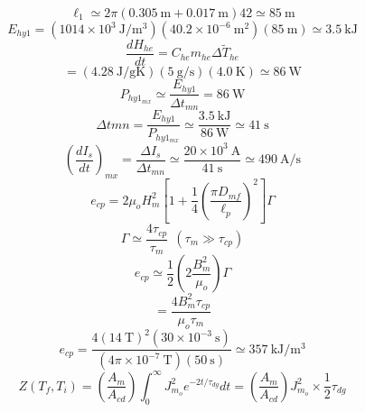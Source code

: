 \begin{equation}%
\ell_1\simeq2\pi(0.305\ \mathrm{m}+0.017\ \mathrm{m})42\simeq85\ \mathrm{m}
\end{equation}
\begin{equation}%
E_{hy1}=(1014\times10^3\ \mathrm{J/m^3})(40.2\times10^{-6}\ \mathrm{m^2})(85\ \mathrm{m})\simeq 3.5\ \mathrm{kJ}
\end{equation}
\begin{equation}%
\frac{dH_{he}}{dt}=C_{he}m_{he}\Delta\tilde{T}_{he}
\end{equation}
\begin{equation}%
=(4.28\ \mathrm{J/gK})(5\ \mathrm{g/s})(4.0\ \mathrm{K})\simeq86\ \mathrm{W}
\end{equation}
\begin{equation}%
P_{hy1_{mx}}\simeq\frac{E_{hy1}}{\Delta t_{mn}}=86\ \mathrm{W}
\end{equation}
\begin{equation}%
\Delta t{mn}=\frac{E_{hy1}}{P_{hy1_{mx}}}\simeq\frac{3.5\ \mathrm{kJ}}{86\ \mathrm{W}}\simeq41\ \mathrm{s}
\end{equation}
\begin{equation}%
(\frac{dI_s}{dt})_{mx}=\frac{\Delta I_s}{\Delta t_{mn}}\simeq\frac{20\times10^3\ \mathrm{A}}{41\ \mathrm{s}}\simeq490\ \mathrm{A/s}
\end{equation}
\begin{equation}%
e_{cp}=2\mu_oH_{m}^2[1+\frac{1}{4}(\frac{\pi D_{mf}}{\ell_p})^2]\Gamma
\end{equation}
\begin{equation}%
\Gamma\simeq\frac{4\tau_{cp}}{\tau_m}\   \  (\tau_m\gg \tau_{cp})
\end{equation}
\begin{equation}%
e_{cp}\simeq\frac{1}{2}(2\frac{B_m^2}{\mu_o})\Gamma
\end{equation}
\begin{equation}%
=\frac{4B_m^2\tau_{cp}}{\mu_o\tau_m}
\end{equation}
\begin{equation}%
e_{cp}=\frac{4(14\ \mathrm{T})^2(30\times10^{-3}\ \mathrm{s})}{(4\pi\times10^{-7}\ \mathrm{T})(50\ \mathrm{s})}\simeq357\ \mathrm{kJ/m^3}
\end{equation}
\begin{equation}%
Z(T_f,T_i)=(\frac{A_m}{A_{cd}})\int_{0}^{\infty}J_{m_o}^2e^{-2t/\tau_{dg}}dt=(\frac{A_m}{A_{cd}})J_{m_o}^2\times\frac{1}{2}\tau_{dg}
\end{equation}






